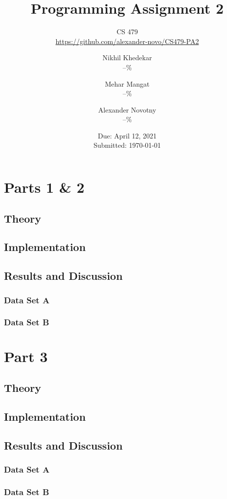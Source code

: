 \documentclass[headings=optiontoheadandtoc,listof=totoc,parskip=full]{scrartcl}
\title{Programming Assignment 2}
\subtitle{CS 479\\\url{https://github.com/alexander-novo/CS479-PA2}}
\author{Nikhil Khedekar\\--\% \and Mehar Mangat\\--\% \and Alexander Novotny\\--\%}
\date{Due: April 12, 2021 \\ Submitted: \today}
\begin{document}
\maketitle
\tableofcontents
{}

\newpage
{}

\section{Parts 1 \& 2}
\label{sec:part-1}

\subsection{Theory}

\subsection{Implementation}
\label{sec:part-1-impl}


\subsection{Results and Discussion}

\subsubsection{Data Set A}
\label{sec:results-bayes-a}


\subsubsection{Data Set B}


\section{Part 3}
\label{sec:part-3}

\subsection{Theory}
\label{sec:part-3-theory}


\subsection{Implementation}
\label{sec:part-3-impl}


\subsection{Results and Discussion}

\subsubsection{Data Set A}

\subsubsection{Data Set B}
\end{document}
